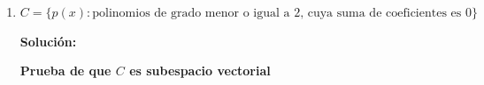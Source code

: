\documentclass[12pt]{article}
\newcommand{\solucion}{%
    \vspace{0.8em}%
    \textbf{Solución:}%
    \vspace{0.8em}%
}
\begin{document}
\begin{enumerate}[label=\alph*.-]
    Separamos según los parámetros libres $x$ y $z$:
    \[
    \begin{pmatrix} x & -x \\ z & 0 \end{pmatrix} = x\begin{pmatrix}1 & -1\\ 0 & 0\end{pmatrix} + z\begin{pmatrix}0 & 0\\ 1 & 0\end{pmatrix}
    \]

    Es decir, todo elemento de $B$ se escribe como combinación lineal de $M_1=\begin{pmatrix}1&-1\\0&0\end{pmatrix}$ y $M_2=\begin{pmatrix}0&0\\1&0\end{pmatrix}$. Por lo tanto:
    \[
    B = \operatorname{gen}\left\{ \begin{pmatrix}1&-1\\0&0\end{pmatrix},\, \begin{pmatrix}0&0\\1&0\end{pmatrix} \right\}
    \]

    Además, $M_1$ y $M_2$ son linealmente independientes, pues si $\alpha M_1+\beta M_2 = \begin{pmatrix}0&0\\0&0\end{pmatrix}$, se obtiene $\alpha=0$ (de la entrada $(1,1)$) y $\beta=0$ (de la entrada $(2,1)$).

    \textbf{Conclusión:}
    \[
    \text{Base de } B = \left\{ \begin{pmatrix}1&-1\\0&0\end{pmatrix},\, \begin{pmatrix}0&0\\1&0\end{pmatrix} \right\}, \qquad \dim(B) = 2.
    \]

    \item $C = \{p(x): \text{polinomios de grado menor o igual a 2, cuya suma de coeficientes es } 0\}$

    \solucion

    \textbf{Prueba de que $C$ es subespacio vectorial}


\end{enumerate}
\end{document}
